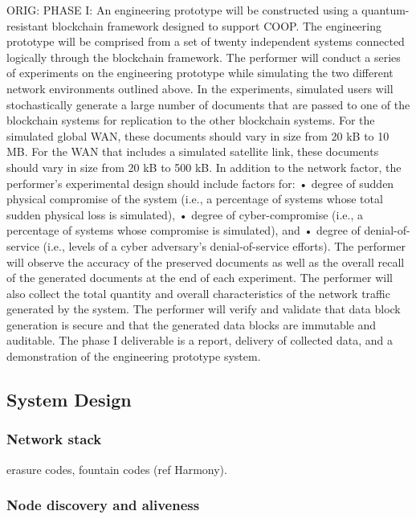 ORIG:
PHASE I: An engineering prototype will be constructed using a quantum-resistant blockchain framework designed to support
COOP. The engineering prototype will be comprised from a set of twenty independent systems connected logically through
the blockchain framework. The performer will conduct a series of experiments on the engineering prototype while
simulating the two different network environments outlined above. In the experiments, simulated users will
stochastically generate a large number of documents that are passed to one of the blockchain systems for replication to
the other blockchain systems. For the simulated global WAN, these documents should vary in size from 20 kB to 10 MB. For
the WAN that includes a simulated satellite link, these documents should vary in size from 20 kB to 500 kB. In addition
to the network factor, the performer’s experimental design should include factors for: • degree of sudden physical
compromise of the system (i.e., a percentage of systems whose total sudden physical loss is simulated), • degree of
cyber-compromise (i.e., a percentage of systems whose compromise is simulated), and • degree of denial-of-service (i.e.,
levels of a cyber adversary’s denial-of-service efforts). The performer will observe the accuracy of the preserved
documents as well as the overall recall of the generated documents at the end of each experiment. The performer will
also collect the total quantity and overall characteristics of the network traffic generated by the system. The
performer will verify and validate that data block generation is secure and that the generated data blocks are immutable
and auditable. The phase I deliverable is a report, delivery of collected data, and a demonstration of the engineering
prototype system.

\subsection{System Design}

\subsubsection{Network stack}

erasure codes, fountain codes (ref Harmony).

\subsubsection{Node discovery and aliveness}

